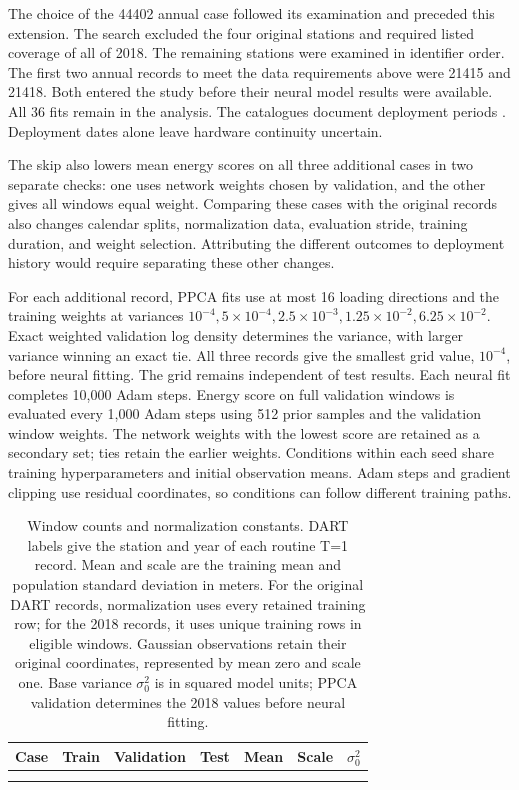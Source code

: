 \documentclass{article}
\begin{document}
The choice of the 44402 annual case followed its examination and preceded this extension. The search excluded the four original stations and required listed coverage of all of 2018. The remaining stations were examined in identifier order. The first two annual records to meet the data requirements above were 21415 and 21418. Both entered the study before their neural model results were available. All 36 fits remain in the analysis. The catalogues document deployment periods \citep{NCEIDART44402,NCEIDART21415,NCEIDART21418}. Deployment dates alone leave hardware continuity uncertain.

The skip also lowers mean energy scores on all three additional cases in two separate checks: one uses network weights chosen by validation, and the other gives all windows equal weight. Comparing these cases with the original records also changes calendar splits, normalization data, evaluation stride, training duration, and weight selection. Attributing the different outcomes to deployment history would require separating these other changes.

For each additional record, PPCA fits use at most 16 loading directions and the training weights at variances $10^{-4},5\times10^{-4},2.5\times10^{-3},1.25\times10^{-2},6.25\times10^{-2}$. Exact weighted validation log density determines the variance, with larger variance winning an exact tie. All three records give the smallest grid value, $10^{-4}$, before neural fitting. The grid remains independent of test results. Each neural fit completes 10,000 Adam steps. Energy score on full validation windows is evaluated every 1,000 Adam steps using 512 prior samples and the validation window weights. The network weights with the lowest score are retained as a secondary set; ties retain the earlier weights. Conditions within each seed share training hyperparameters and initial observation means. Adam steps and gradient clipping use residual coordinates, so conditions can follow different training paths.

\begin{table}[H]
\centering
\setlength{\tabcolsep}{3pt}
\caption{Window counts and normalization constants. DART labels give the station and year of each routine T=1 record. Mean and scale are the training mean and population standard deviation in meters. For the original DART records, normalization uses every retained training row; for the 2018 records, it uses unique training rows in eligible windows. Gaussian observations retain their original coordinates, represented by mean zero and scale one. Base variance $\sigma_0^2$ is in squared model units; PPCA validation determines the 2018 values before neural fitting.}
\label{tab:data}
\begin{tabular}{lrrrrrr}
\toprule
Case & Train & Validation & Test & Mean & Scale & $\sigma_0^2$\\
\midrule
\\
\midrule
\\
\bottomrule
\end{tabular}
\end{table}
\end{document}
